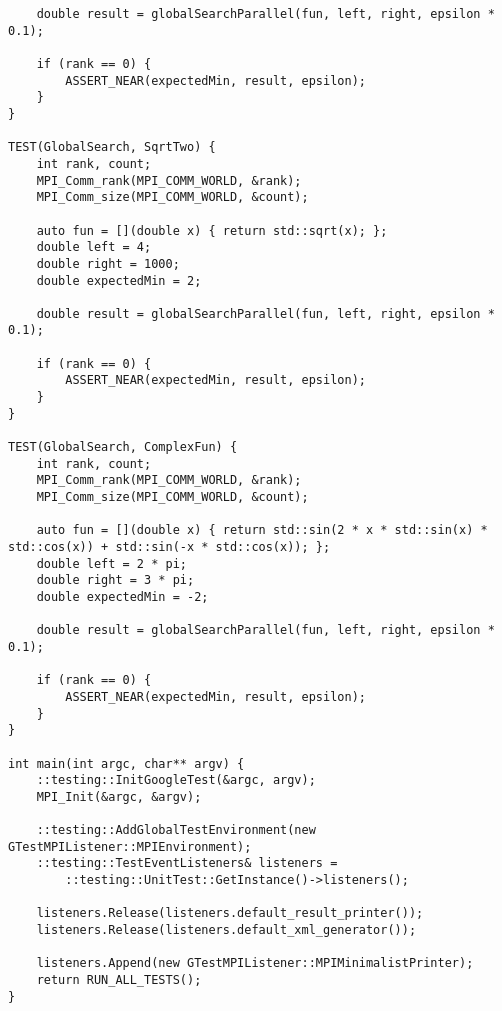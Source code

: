 \documentclass[14pt, a4paper]{extarticle}
\begin{document}
\begin{lstlisting}
    double result = globalSearchParallel(fun, left, right, epsilon * 0.1);

    if (rank == 0) {
        ASSERT_NEAR(expectedMin, result, epsilon);
    }
}

TEST(GlobalSearch, SqrtTwo) {
    int rank, count;
    MPI_Comm_rank(MPI_COMM_WORLD, &rank);
    MPI_Comm_size(MPI_COMM_WORLD, &count);

    auto fun = [](double x) { return std::sqrt(x); };
    double left = 4;
    double right = 1000;
    double expectedMin = 2;

    double result = globalSearchParallel(fun, left, right, epsilon * 0.1);

    if (rank == 0) {
        ASSERT_NEAR(expectedMin, result, epsilon);
    }
}

TEST(GlobalSearch, ComplexFun) {
    int rank, count;
    MPI_Comm_rank(MPI_COMM_WORLD, &rank);
    MPI_Comm_size(MPI_COMM_WORLD, &count);

    auto fun = [](double x) { return std::sin(2 * x * std::sin(x) * std::cos(x)) + std::sin(-x * std::cos(x)); };
    double left = 2 * pi;
    double right = 3 * pi;
    double expectedMin = -2;

    double result = globalSearchParallel(fun, left, right, epsilon * 0.1);

    if (rank == 0) {
        ASSERT_NEAR(expectedMin, result, epsilon);
    }
}

int main(int argc, char** argv) {
    ::testing::InitGoogleTest(&argc, argv);
    MPI_Init(&argc, &argv);

    ::testing::AddGlobalTestEnvironment(new GTestMPIListener::MPIEnvironment);
    ::testing::TestEventListeners& listeners =
        ::testing::UnitTest::GetInstance()->listeners();

    listeners.Release(listeners.default_result_printer());
    listeners.Release(listeners.default_xml_generator());

    listeners.Append(new GTestMPIListener::MPIMinimalistPrinter);
    return RUN_ALL_TESTS();
}
	\end{lstlisting}
	\newpage
\end{document}
